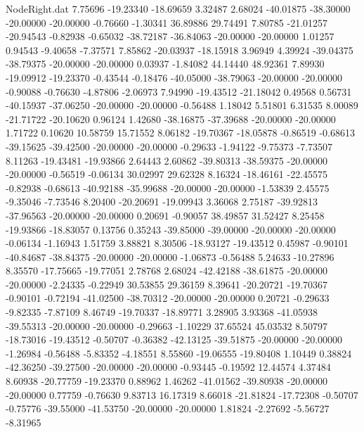 \begin{filecontents}{NodeRight.dat}
   7.75696  -19.23340  -18.69659     3.32487    2.68024  -40.01875  -38.30000  -20.00000  -20.00000   -0.76660   -1.30341   36.89886   29.74491
   7.80785  -21.01257  -20.94543    -0.82938   -0.65032  -38.72187  -36.84063  -20.00000  -20.00000    1.01257    0.94543   -9.40658   -7.37571
   7.85862  -20.03937  -18.15918     3.96949    4.39924  -39.04375  -38.79375  -20.00000  -20.00000    0.03937   -1.84082   44.14440   48.92361
   7.89930  -19.09912  -19.23370    -0.43544   -0.18476  -40.05000  -38.79063  -20.00000  -20.00000   -0.90088   -0.76630   -4.87806   -2.06973
   7.94990  -19.43512  -21.18042     0.49568    0.56731  -40.15937  -37.06250  -20.00000  -20.00000   -0.56488    1.18042    5.51801    6.31535
   8.00089  -21.71722  -20.10620     0.96124    1.42680  -38.16875  -37.39688  -20.00000  -20.00000    1.71722    0.10620   10.58759   15.71552
   8.06182  -19.70367  -18.05878    -0.86519   -0.68613  -39.15625  -39.42500  -20.00000  -20.00000   -0.29633   -1.94122   -9.75373   -7.73507
   8.11263  -19.43481  -19.93866     2.64443    2.60862  -39.80313  -38.59375  -20.00000  -20.00000   -0.56519   -0.06134   30.02997   29.62328
   8.16324  -18.46161  -22.45575    -0.82938   -0.68613  -40.92188  -35.99688  -20.00000  -20.00000   -1.53839    2.45575   -9.35046   -7.73546
   8.20400  -20.20691  -19.09943     3.36068    2.75187  -39.92813  -37.96563  -20.00000  -20.00000    0.20691   -0.90057   38.49857   31.52427
   8.25458  -19.93866  -18.83057     0.13756    0.35243  -39.85000  -39.00000  -20.00000  -20.00000   -0.06134   -1.16943    1.51759    3.88821
   8.30506  -18.93127  -19.43512     0.45987   -0.90101  -40.84687  -38.84375  -20.00000  -20.00000   -1.06873   -0.56488    5.24633  -10.27896
   8.35570  -17.75665  -19.77051     2.78768    2.68024  -42.42188  -38.61875  -20.00000  -20.00000   -2.24335   -0.22949   30.53855   29.36159
   8.39641  -20.20721  -19.70367    -0.90101   -0.72194  -41.02500  -38.70312  -20.00000  -20.00000    0.20721   -0.29633   -9.82335   -7.87109
   8.46749  -19.70337  -18.89771     3.28905    3.93368  -41.05938  -39.55313  -20.00000  -20.00000   -0.29663   -1.10229   37.65524   45.03532
   8.50797  -18.73016  -19.43512    -0.50707   -0.36382  -42.13125  -39.51875  -20.00000  -20.00000   -1.26984   -0.56488   -5.83352   -4.18551
   8.55860  -19.06555  -19.80408     1.10449    0.38824  -42.36250  -39.27500  -20.00000  -20.00000   -0.93445   -0.19592   12.44574    4.37484
   8.60938  -20.77759  -19.23370     0.88962    1.46262  -41.01562  -39.80938  -20.00000  -20.00000    0.77759   -0.76630    9.83713   16.17319
   8.66018  -21.81824  -17.72308    -0.50707   -0.75776  -39.55000  -41.53750  -20.00000  -20.00000    1.81824   -2.27692   -5.56727   -8.31965

\end{filecontents}
